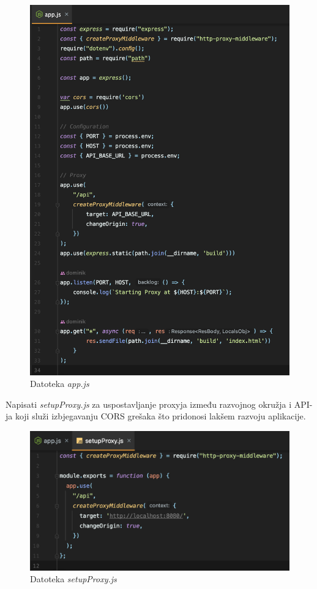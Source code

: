 			\begin{figure}[H]
				\includegraphics[scale=0.4]{slike/deploy/frontend5.png} %
				\centering
				\caption{Datoteka \textit{app.js}}
				\label{fig:promjene}
			\end{figure}
			
			Napisati \textit{setupProxy.js} za uspostavljanje proxyja između razvojnog okružja i API-ja koji služi izbjegavanju CORS grešaka što pridonosi lakšem razvoju aplikacije.
			\begin{figure}[H]
				\includegraphics[scale=0.4]{slike/deploy/frontend6.png} %
				\centering
				\caption{Datoteka \textit{setupProxy.js}}
				\label{fig:promjene}
			\end{figure}
			
